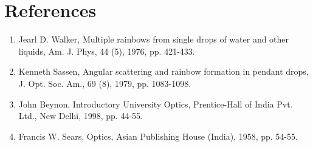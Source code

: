 \section*{References}
\begin{enumerate}
\item Jearl D. Walker, Multiple rainbows from single drops of water and other liquids, Am. J. Phys, 44 (5), 1976, pp. 421-433.
\item Kenneth Sassen, Angular scattering and rainbow formation in pendant drops, J. Opt. Soc. Am., 69 (8), 1979, pp. 1083-1098. 
\item John Beynon, Introductory University Optics, Prentice-Hall of India Pvt. Ltd., New Delhi, 1998, pp. 44-55.
\item Francis W. Sears, Optics, Asian Publishing House (India), 1958, pp. 54-55. 

\end{enumerate}

